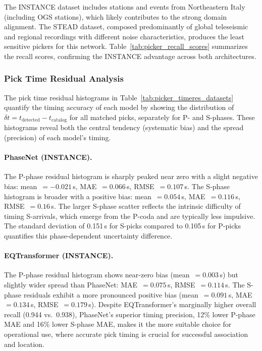The INSTANCE dataset includes stations and events from Northeastern Italy
(including OGS stations), which likely contributes to the strong domain
alignment. The STEAD dataset, composed predominantly of global teleseismic and
regional recordings with different noise characteristics, produces the least
sensitive pickers for this network. Table~\ref{tab:picker_recall_scores}
summarizes the recall scores, confirming the INSTANCE advantage across both
architectures.

\subsubsection{Pick Time Residual Analysis}
The pick time residual histograms in Table~\ref{tab:picker_timeres_datasets}
quantify the timing accuracy of each model by showing the distribution of
$\delta t = t_{\text{detected}} - t_{\text{catalog}}$ for all matched picks,
separately for P- and S-phases. These histograms reveal both the central
tendency (systematic bias) and the spread (precision) of each model's timing.

\paragraph{PhaseNet (INSTANCE).}
The P-phase residual histogram is sharply peaked near zero with a slight
negative bias: mean~$= -0.021$\,s, MAE~$= 0.066$\,s, RMSE~$= 0.107$\,s. The
S-phase histogram is broader with a positive bias: mean~$= 0.054$\,s,
MAE~$= 0.116$\,s, RMSE~$= 0.16$\,s. The larger S-phase scatter reflects the
intrinsic difficulty of timing S-arrivals, which emerge from the P-coda and are
typically less impulsive. The standard deviation of 0.151\,s for S-picks
compared to 0.105\,s for P-picks quantifies this phase-dependent uncertainty
difference.

\paragraph{EQTransformer (INSTANCE).}
The P-phase residual histogram shows near-zero bias (mean~$= 0.003$\,s) but
slightly wider spread than PhaseNet: MAE~$= 0.075$\,s, RMSE~$= 0.114$\,s.
The S-phase residuals exhibit a more pronounced positive bias
(mean~$=0.091$\,s, MAE~$= 0.134$\,s, RMSE~$= 0.179$\,s). Despite
EQTransformer's marginally higher overall recall (0.944 vs.\ 0.938), PhaseNet's
superior timing precision, 12\% lower P-phase MAE and 16\% lower S-phase MAE,
makes it the more suitable choice for operational use, where accurate pick
timing is crucial for successful association and location.

